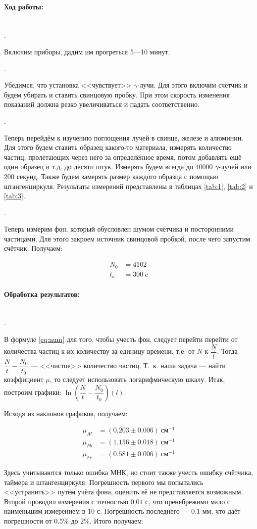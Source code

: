 \documentclass[a4paper, 12pt]{article}
\newcommand{\parag}[1]{\paragraph*{#1:}}
\newcounter{Points}
\newcommand{\point}{\arabic{Points}. \addtocounter{Points}{1}}
\begin{document}
\parag {Ход работы} ~\\

\point Включим приборы, дадим им прогреться 5---10 минут.

\point Убедимся, что установка <<чувствует>> $\gamma$-лучи. Для этого включим счётчик и будем убирать и ставить свинцовую пробку. При этом скорость изменения показаний должна резко увеличиваться и падать соответственно.

\point Теперь перейдём к изучению поглощения лучей в свинце, железе и алюминии. Для этого будем ставить образец какого-то материала, измерять количество частиц, пролетающих через него за определённое время, потом добавлять ещё один образец и т.д. до десяти штук. Измерять будем всегда до $40000$ $\gamma$-лучей или $200$ секунд. Также будем замерять размер каждого образца с помощью штангенциркуля. Результаты измерений представлены в таблицах \ref{tab:1}, \ref{tab:2} и \ref{tab:3}.


\point Теперь измерим фон, который обусловлен шумом счётчика и посторонними частицами. Для этого закроем источник свинцовой пробкой, после чего запустим счётчик. Получаем:

\begin{align*}
    N_0 &= 4102 \\
    t_o &= 300~c
\end{align*}

\parag {Обработка результатов} ~\\

\point В формуле \eqref{eq:num} для того, чтобы учесть фон, следует перейти перейти от количества частиц к их количеству за единицу времени, т.е. от $N$ к $\dfrac{N}{t}$. Тогда $\dfrac{N}{t} - \dfrac{N_0}{t_0}$ --- <<чистое>> количество частиц. Т.~к. наша задача --- найти коэффициент $\mu$, то следует использовать логарифмическую шкалу. Итак, построим графики: $\ln (\dfrac{N}{t} - \dfrac{N_0}{t_0}) (l)$.

Исходя из наклонов графиков, получаем:

\begin{align*}
    \mu_{Al} &= (0.203 \pm 0.006) ~ см^{-1} \\
    \mu_{Pb} &= (1.156 \pm 0.018) ~ см^{-1} \\
    \mu_{Fe} &= (0.581 \pm 0.006) ~ см^{-1} 
\end{align*}

Здесь учитываются только ошибка МНК, но стоит также учесть ошибку счётчика, таймера и штангенциркуля. Погрешность первого мы попытались <<устранить>> путём учёта фона, оценить её не представляется возможным. Второй проводил измерения с точностью $0.01$ с, что пренебрежимо мало с наименьшим измерением в $10$ с. Погрешность последнего --- $0.1$ мм, что даёт погрешности от $0.5\%$ до $2\%$. Итого получаем:
\end{document}
